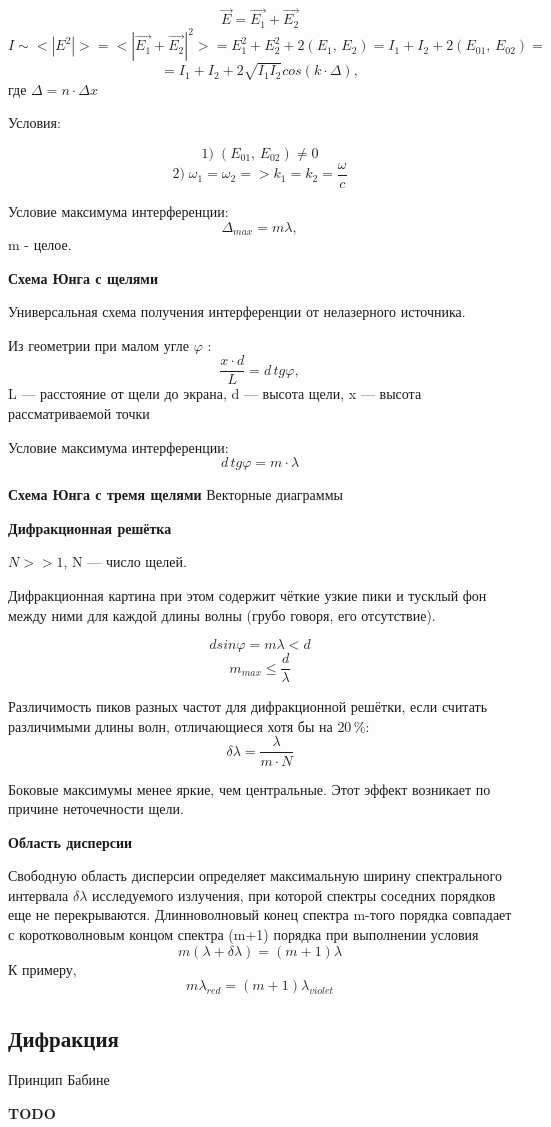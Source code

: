 \documentclass[a4paper,12pt]{article}
\begin{document}
		$$ \vec{E} = \vec{E_1} + \vec{E_2} $$
		$$ I \sim <|E^2|> = <|\vec{E_1} + \vec{E_2}|^2> = E_1^2+E_2^2+2(E_1, \, E_2) = I_1 + I_2 + 2(E_{01}, \, E_{02}) = $$
		$$ = I_1 + I_2 + 2\sqrt{I_1I_2}cos(k\cdot \Delta),$$
		где $ \Delta = n \cdot \Delta x$
		
		\vspace{0.5cm}
		Условия:
		
		$$ 1) \; (E_{01}, \, E_{02}) \neq 0 $$
		$$ 2) \;  \omega_1 = \omega_2 => k_1=k_2=\frac{\omega}{c}$$
		
		\vspace{0.5cm}
		Условие максимума интерференции:
		$$ \Delta_{max} = m\lambda, $$
		m - целое.
		
		\vspace{0.5cm}
		\textbf{Схема Юнга с щелями}
		
		Универсальная схема получения интерференции от нелазерного источника.
		
		Из геометрии при малом угле $\varphi$ :
		$$ \frac{x\cdot d}{L} = d \, tg \varphi, $$
		L --- расстояние от щели до экрана, d --- высота щели, x --- высота рассматриваемой точки
		
		Условие максимума интерференции:
		$$ d \, tg \varphi = m\cdot \lambda $$
		
		\vspace{0.5cm}
		\textbf{Схема Юнга с тремя щелями}
		Векторные диаграммы
		
		\vspace{0.5cm}
		\textbf{Дифракционная решётка}
		
		$N >> 1$, N --- число щелей.
		
		Дифракционная картина при этом содержит чёткие узкие пики и тусклый фон между ними для каждой длины волны (грубо говоря, его отсутствие).
		
		$$ dsin \varphi = m\lambda < d $$
		$$ m_{max} \leq \frac{d}{\lambda} $$
		
		\vspace{0.5cm}
		Различимость пиков разных частот для дифракционной решётки, если считать различимыми длины волн, отличающиеся хотя бы на $20 \, \%$:
		$$ \delta \lambda = \frac{\lambda}{m\cdot N} $$
		
		
		\vspace{0.5cm}
		Боковые максимумы менее яркие, чем центральные. Этот эффект возникает по причине неточечности щели.
		
		\vspace{0.5cm}
		\textbf{Область дисперсии}
		
		Свободную область дисперсии определяет максимальную ширину спектрального интервала $\delta \lambda$ исследуемого излучения, при которой спектры соседних порядков еще не перекрываются. Длинноволновый конец спектра m-того порядка совпадает с коротковолновым концом спектра (m+1) порядка при выполнении условия
		$$ m ( \lambda + \delta \lambda ) = (m+1)\lambda $$
		К примеру,
		$$ m \lambda_{red} = (m+1)\lambda_{violet} $$

		
		\subsection{Дифракция}		
		Принцип Бабине
		
		\textbf{TODO}
	
\end{document}
